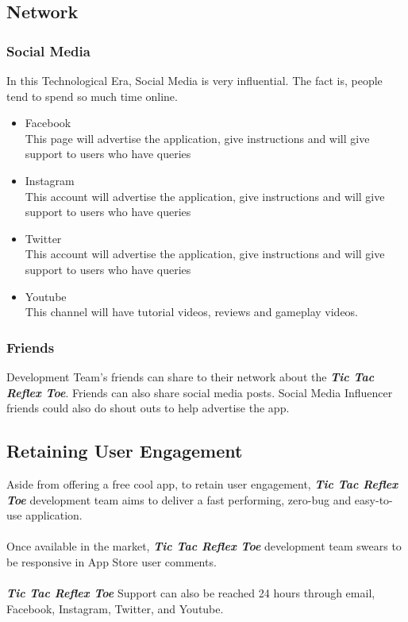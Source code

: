 \documentclass{article}
\begin{document}
\subsection{Network}
    \subsubsection{Social Media}
        In this Technological Era, Social Media is very influential.  The fact is, people tend to spend so much time online.  
        \newline
        \begin{itemize}
        	\item Facebook\\This page will advertise the application, give instructions and will give support to users who have queries
        	\item Instagram\\This account will advertise the application, give instructions and will give support to users who have queries
        	\item Twitter\\This account will advertise the application, give instructions and will give support to users who have queries
        	\item Youtube\\This channel will have tutorial videos, reviews and gameplay videos.
        \end{itemize}
    
    \subsubsection{Friends}
        Development Team's friends can share to their network about the \textbf{\emph{Tic Tac Reflex Toe}}. Friends can also share social media posts.  Social Media Influencer friends could also do shout outs to help advertise the app.
    ~\newline
\subsection{Retaining User Engagement}
    Aside from offering a free cool app, to retain user engagement, \textbf{\emph{Tic Tac Reflex Toe}} development team aims to deliver a fast performing, zero-bug and easy-to-use application.\\\\
    Once available in the market, \textbf{\emph{Tic Tac Reflex Toe}} development team swears to be responsive in  App Store user comments.\\\\
    \textbf{\emph{Tic Tac Reflex Toe}} Support can also be reached 24 hours through email, Facebook, Instagram, Twitter, and Youtube.
    ~\newline
\end{document}
